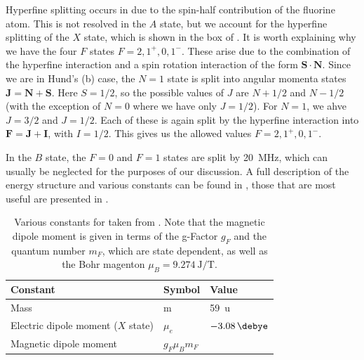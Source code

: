 Hyperfine splitting occurs in \CaF{} due to the spin-half contribution of the
fluorine atom. This is not resolved in the $A$ state, but we account for the
hyperfine splitting of the $X$ state, which is shown in the box of
. It is worth explaining why we have the four
$F$ states $F=2,1^+,0,1^-$. These arise due to the combination  of the
hyperfine interaction and a spin rotation interaction of the form
$\mathbf{S}\cdot\mathbf{N}$. Since we are in Hund's (b) case, the $N=1$ state
is split into angular momenta states $\mathbf{J}= \mathbf{N} + \mathbf{S}$.
Here $S=1/2$, so the possible values of $J$ are $N+1/2$ and $N-1/2$ (with the
exception of $N=0$ where we have only $J=1/2$). For $N=1$, we ahve $J=3/2$ and
$J=1/2$. Each of these is again split by the hyperfine interaction into
$\mathbf{F} = \mathbf{J} + \mathbf{I}$, with $I=1/2$. This gives us the allowed
values $F=2,1^+,0,1^-$.

In the $B$ state, the $F=0$ and $F=1$ states are split by \SI{20}{\mega\hertz},
which can usually be neglected for the purposes of our discussion. A full
description of the \CaF{} energy structure and various constants can be found
in , those that are most useful are presented in
.

\begin{table}
  \centering
\begin{tabular}{lll}
  \hline\hline
  Constant & Symbol & Value \\
  \hline
  Mass & m & \SI{59}{\amu}\\
  Electric dipole moment ($X$ state) & $\mu_e$ & $\SI{-3.08}{\debye}$\\
  Magnetic dipole moment & $g_F\mu_B m_F$ & \\
 \hline
\end{tabular}
\caption[\CaF{} constants]{
  Various constants for \CaF{} taken from . Note that
  the magnetic dipole moment is given in terms of the g-Factor $g_F$ and the
  quantum number $m_F$, which are state dependent, as well as the Bohr magenton
  $\mu_B = \SI{9.274}{\joule\per\tesla}$.
  }
  \label{overview:table:constants}
\end{table}

